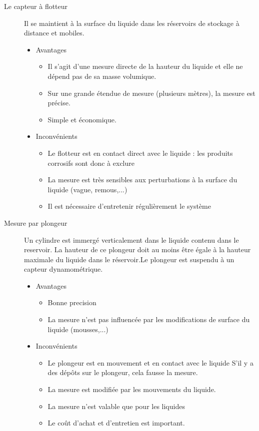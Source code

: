 	\begin {description}
		\item [Le capteur à flotteur]
		Il se maintient à la surface du liquide dans les réservoirs de stockage à distance et mobiles. 
		\begin {itemize}
			\item Avantages
			\begin {itemize}
				\item Il s'agit d'une mesure directe de la hauteur du liquide et elle ne dépend pas de sa masse volumique. 
		   		\item Sur une grande étendue de mesure (plusieurs mètres), la mesure est précise.
		   		\item Simple et économique.
			\end {itemize}
			
			\item Inconvénients
			\begin {itemize}
				\item Le flotteur est en contact direct avec le liquide : les produits corrosifs sont donc à exclure
				\item La mesure est très sensibles aux perturbations à la surface du liquide (vague, remous,...) 
				\item Il est nécessaire d'entretenir régulièrement le système
			\end {itemize}
		\end {itemize}
		\item [Mesure par plongeur]
			Un cylindre est immergé verticalement dans le liquide contenu dans le reservoir. La hauteur de ce plongeur doit au moins être égale à la 				hauteur maximale du liquide dans le réservoir.Le plongeur est suspendu à un capteur dynamométrique.
		\begin {itemize}
			\item Avantages
			\begin {itemize}
				\item Bonne precision
				\item La mesure n'est pas influencée par les modifications de surface du liquide (mousses,...)
 			\end {itemize}

			\item Inconvénients
			\begin {itemize}
				\item Le plongeur est en mouvement et en contact avec le liquide S'il y a des dépôts sur le plongeur, cela fausse la mesure. 
				\item La mesure est modifiée par les mouvements du liquide. 
				\item La mesure n'est valable que pour les liquides 
				\item Le coût d'achat et d'entretien est important.
			\end {itemize}
		\end {itemize}
	\end {description}

